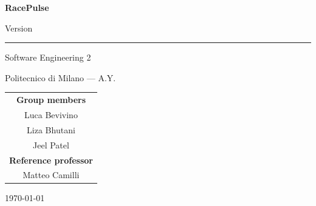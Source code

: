 
\begin{titlepage}
  \thispagestyle{empty}
  \centering

  \vspace*{2.5cm}

  {\fontsize{44}{52}\selectfont\bfseries RacePulse\par}

  \vspace{1cm}

  {\LARGE \docdoctype\par}

  \vspace{0.5cm}

  {\large Version \docversion\par}

  \vfill

  \rule{\textwidth}{0.4pt}

  \vspace{0.8cm}

  {\Large Software Engineering 2\par}
  \vspace{0.2cm}
  {\large Politecnico di Milano --- A.Y. \docacademicyear\par}

  \vfill

  \large
  \begin{tabular}{c}
    \textbf{Group members} \\[0.4em]
    Luca Bevivino \\
    Liza Bhutani \\
    Jeel Patel \\[1.2em]
    \textbf{Reference professor} \\[0.4em]
    Matteo Camilli \\
  \end{tabular}

  \vfill

  {\large \today\par}

  \vspace*{1.5cm}
\end{titlepage}
